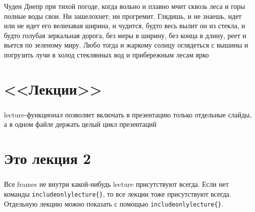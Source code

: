 \documentclass[t, dvipsnames]{beamer}  %
\begin{document}
{
\begin{frame}
\color{white}Чуден Днепр при тихой погоде, когда вольно и плавно мчит сквозь леса и горы полные воды свои. Ни зашелохнет; ни прогремит. Глядишь, и не знаешь, идет или не идет его величавая ширина, и чудится, будто весь вылит он из стекла, и будто голубая зеркальная дорога, без меры в ширину, без конца в длину, реет и вьется по зеленому миру. Любо тогда и жаркому солнцу оглядеться с вышины и погрузить лучи в холод стеклянных вод и прибережным лесам ярко
\end{frame}
}
 

	\section{<<Лекции>>}
	\begin{frame}
		\frametitle{\insertsection}
		lecture-функционал позволяет включать в презентацию только отдельные слайды, а в одном файле держать целый цикл презентаций 
	\end{frame}

	\section{Это лекция 2}
	\begin{frame}
	\frametitle{\insertsection}
		Все frames не внутри какой-нибудь lecture присутствуют всегда. Если нет  команды \verb"includeonlylecture{}", то все лекции тоже присутствуют всегда. Отдельную лекцию можно показать с помощью \verb"includeonlylecture{}".
	\end{frame}
\end{document}
